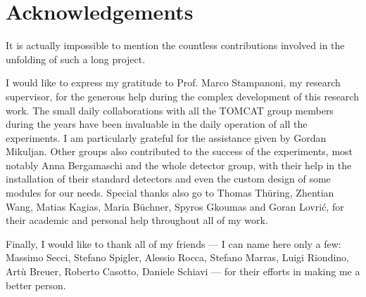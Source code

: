 
\bigskip

\begingroup
\let\clearpage\relax
\let\cleardoublepage\relax
\let\cleardoublepage\relax
\chapter*{Acknowledgements}
It is actually impossible to mention the countless contributions involved in
the unfolding of such a long project.

I would like to express my gratitude
to Prof. Marco Stampanoni, my research
supervisor, for the generous help during the complex development
of this research work. The small daily collaborations with all the TOMCAT
group members during the years have been invaluable in the daily operation
of all the experiments. I am particularly grateful for the assistance given
by Gordan Mikuljan. Other groups also contributed to the success of the
experiments, most notably Anna Bergamaschi and the whole detector group, with
their help in the installation of their standard detectors and even the
custom design of some modules for our needs.
Special thanks also go to Thomas Th\"uring, Zhentian Wang, Matias Kagias, Maria B\"uchner,
Spyros Gkoumas and Goran Lovri\'c, for their academic and personal help
throughout all of my work.

Finally, I would like to thank all of my friends --- I can name here only a
few: Massimo Secci, Stefano Spigler, Alessio Rocca, Stefano Marras, Luigi
Riondino, Art\`u Breuer, Roberto Casotto, Daniele Schiavi --- for their
efforts in making me a better person.
\endgroup
